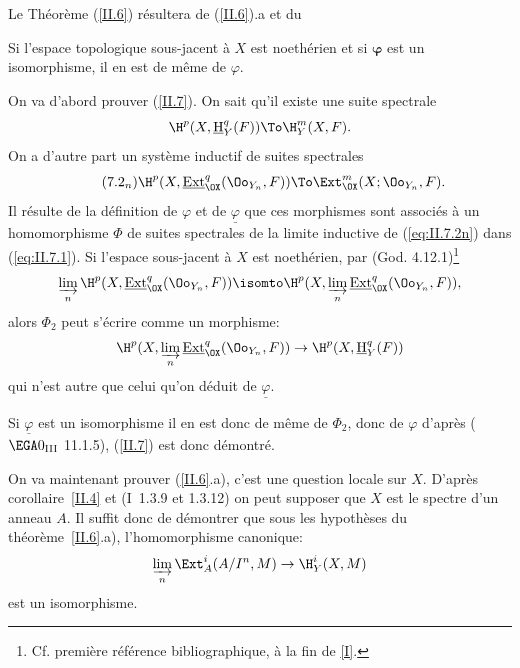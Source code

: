 Le Th\'eor\`eme (\ref{II.6}) r\'esultera de (\ref{II.6}).a et du

\begin{suplemme} \label{II.7} Si l'espace topologique sous-jacent \`a $X$ est noeth\'erien et si $\boldsymbol{\varphi}$ est un isomorphisme, il en est de m\^eme de $\varphi$.
\end{suplemme}

On va d'abord prouver (\ref{II.7}). On sait qu'il existe une suite spectrale
\begin{equation} \label{eq:II.7.1}
\H^p(X, {\mathop{\underline{\mathrm{H}}}\nolimits}_Y^q(F)) \To \H_Y^{m}(X, F).
\end{equation}
On a d'autre part un syst\`eme inductif de suites spectrales
\begin{equation*} \label{eq:II.7.2n} \tag{7.2$_n$}
\H^p(X, {\mathop{\underline{\mathrm{Ext}}}\nolimits}_{\OX}^q(\Oo_{Y_n}, F)) \To \Ext_{\OX}^{m}(X;\Oo_{Y_n}, F).
\end{equation*}
Il r\'esulte de la d\'efinition de $\varphi$ et de $\underline{\varphi}$ que ces morphismes sont associ\'es \`a un homomorphisme $\Phi$ de suites spectrales de la limite inductive de (\ref{eq:II.7.2n}) dans (\ref{eq:II.7.1}). Si l'espace sous-jacent \`a $X$ est noeth\'erien, par (God. 4.12.1)\footnote{Cf. premi\`ere r\'ef\'erence bibliographique, \`a la fin de \Exp \ref{I}.}
\begin{equation*}
\varinjlim_{n} \H^p(X, {\mathop{\underline{\mathrm{Ext}}}\nolimits}_{\OX}^q(\Oo_{Y_n}, F))\isomto \H^p(X, \varinjlim_{n} {\mathop{\underline{\mathrm{Ext}}}\nolimits}_{\OX}^q(\Oo_{Y_n}, F)),
\end{equation*}
alors $\Phi_2$ peut s'\'ecrire comme un morphisme:
\begin{equation*} \H^p(X, \varinjlim_{n} {\mathop{\underline{\mathrm{Ext}}}\nolimits}_{\OX}^q(\Oo_{Y_n}, F)) \to \H^p(X, {\mathop{\underline{\mathrm{H}}}\nolimits}_Y^q(F))
\end{equation*}
qui n'est autre que celui qu'on d\'eduit de $\underline{\varphi}$.

Si $\underline{\varphi}$ est un isomorphisme il en est donc de m\^eme de $\Phi_2$, donc de $\varphi$ d'apr\`es ($\EGA 0_{\textup{III}}$ 11.1.5), (\ref{II.7}) est donc d\'emontr\'e.

On va maintenant prouver (\ref{II.6}.a), c'est une question locale sur $X$. D'apr\`es \ignorespaces corollaire~\ref{II.4} et (\EGA I~1.3.9 et 1.3.12) on peut supposer que $X$ est le spectre d'un anneau $A$. Il suffit donc de d\'emontrer que sous les hypoth\`eses du th\'eor\`eme~\ref{II.6}.a), l'homomorphisme canonique:
\begin{equation} \label{eq:II.7.3} \varinjlim_{n} \Ext_A^i(A/I^n, M) \to \H_Y^i(X, M)
\end{equation}
est un isomorphisme.

